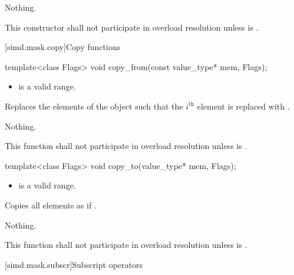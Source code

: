 \begin{wgText}
\begin{itemdescr}
  \pnum\throws Nothing.

  \pnum\remarks
  This constructor shall not participate in overload resolution unless  is .

\end{itemdescr}

[simd.mask.copy]{Copy functions}

\begin{itemdecl}
template<class Flags> void copy_from(const value_type* mem, Flags);
\end{itemdecl}

\begin{itemdescr}
  \pnum\requires
  \begin{itemize}
    \item \tcode{[mem, mem + size())} is a valid range.
  \end{itemize}

  \pnum\effects
  Replaces the elements of the  object such that the $i^\text{th}$ element is replaced with  \foralli.

  \pnum\throws Nothing.

  \pnum\remarks
  This function shall not participate in overload resolution unless  is .

\end{itemdescr}

\begin{itemdecl}
template<class Flags> void copy_to(value_type* mem, Flags);
\end{itemdecl}

\begin{itemdescr}
  \pnum\requires
  \begin{itemize}
    \item \tcode{[mem, mem + size())} is a valid range.
  \end{itemize}

  \pnum\effects
  Copies all  elements as if  \foralli.

  \pnum\throws Nothing.

  \pnum\remarks
  This function shall not participate in overload resolution unless  is .
\end{itemdescr}

[simd.mask.subscr]{Subscript operators}


\end{wgText}
